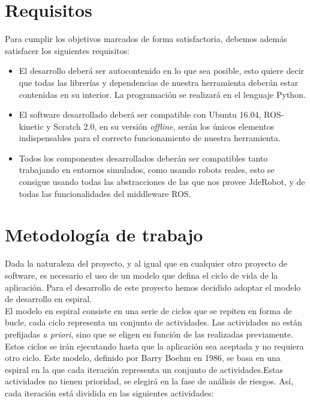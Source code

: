 \section{Requisitos}
\label{sec:requisitos}

Para cumplir los objetivos marcados de forma satisfactoria, debemos además satisfacer
los siguientes requisitos:

\begin{itemize}
\item El desarrollo deberá ser autocontenido en lo que sea posible, esto quiere decir que todas las librerías y dependencias de nuestra herramienta deberán estar contenidas en su interior. La programación se realizará en el
lenguaje Python.
\item El software desarrollado deberá ser compatible con Ubuntu 16.04, ROS-kinetic y Scratch 2.0, en su versión \textit{offline}, serán los únicos elementos indispensables para el correcto funcionamiento de nuestra herramienta.
\item Todos los componentes desarrollados deberán ser compatibles tanto trabajando en entornos simulados, como usando robots reales, esto se consigue usando todas las abstracciones de las que nos provee JdeRobot, y de todas las funcionalidades del middleware ROS.
\end{itemize}



\section{Metodología de trabajo}
\label{sec:metodologia}

Dada la naturaleza del proyecto, y al igual que en cualquier otro proyecto de software, es necesario el uso de un modelo que defina el ciclo de vida de la aplicación. Para el desarrollo de este proyecto hemos decidido adoptar el modelo de desarrollo en espiral.\\

El modelo en espiral consiste en una serie de ciclos que se repiten en forma de
bucle, cada ciclo representa un conjunto de actividades. Las actividades no están
prefijadas \textit{a priori}, sino que se eligen en función de las realizadas previamente. Estos ciclos se irán ejecutando hasta que la aplicación sea aceptada y no requiera otro
ciclo. Este modelo, definido por Barry Boehm en 1986, se basa en una espiral en la que cada iteración representa un conjunto de actividades.Estas actividades no tienen prioridad, se elegirá en la fase de análisis de riesgos. Así, cada iteración está dividida en las siguientes actividades:

